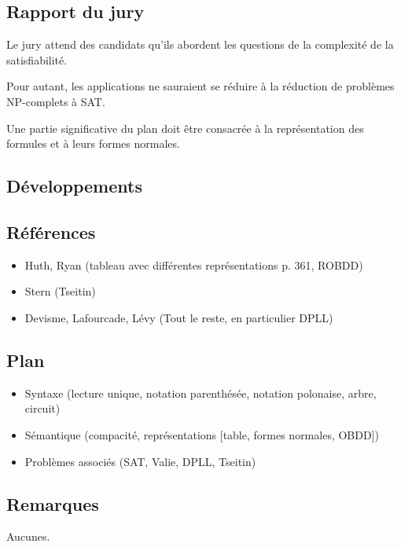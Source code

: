 \documentclass[../../agregation.tex]{subfiles}
\begin{document}

\subsection{Rapport du jury}

\begin{aquote}{}
Le jury attend des candidats qu'ils abordent les questions de la complexité de la satisfiabilité.

Pour autant, les applications ne sauraient se réduire à la réduction de problèmes NP-complets à SAT.

Une partie significative du plan doit être consacrée à la représentation des formules et à leurs formes normales.
\end{aquote}

\subsection{Développements}

\dvts

\subsection{Références}

\begin{itemize}
	\item Huth, Ryan (tableau avec différentes représentations p. 361, ROBDD)
	\item Stern (Tseitin)
	\item Devisme, Lafourcade, Lévy (Tout le reste, en particulier DPLL)
\end{itemize}

\subsection{Plan}

\begin{itemize}
	\item Syntaxe (lecture unique, notation parenthésée, notation polonaise, arbre, circuit)
	\item Sémantique (compacité, représentations [table, formes normales, OBDD])
	\item Problèmes associés (SAT, Valie, DPLL, Tseitin)
\end{itemize}

\subsection{Remarques}

Aucunes.
\end{document}
